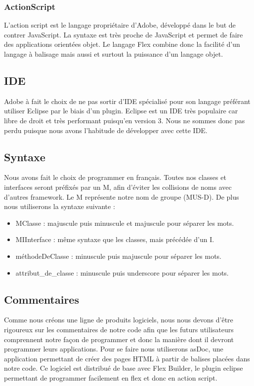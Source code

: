 \documentclass{article}
\begin{document}
		\subsubsection{ActionScript}
			L'action script est le langage propriétaire d'Adobe, développé dans le but de contrer JavaScript. La syntaxe est très proche de JavaScript et permet de faire des applications orientées objet. Le langage Flex combine donc la facilité d'un langage à balisage mais aussi et surtout la puissance d'un langage objet.
	\subsection{IDE}
		Adobe à fait le choix de ne pas sortir d'IDE spécialisé pour son langage préférant utiliser Eclipse par le biais d'un plugin. Eclipse est un IDE très populaire car libre de droit et très performant puisqu'en version 3. Nous ne sommes donc pas perdu puisque nous avons l'habitude de développer avec cette IDE.
	\subsection{Syntaxe}
		Nous avons fait le choix de programmer en français. Toutes nos classes et interfaces seront préfixés par un M, afin d'éviter les collisions de noms avec d'autres framework. Le M représente notre nom de groupe (MUS-D).
		\ident De plus nous utiliserons la syntaxe suivante :
		\begin{itemize}
			\item MClasse : majuscule puis minuscule et majuscule pour séparer les mots.
			\item MIInterface : même syntaxe que les classes, mais précédée d'un I.
			\item méthodeDeClasse : minuscule puis majuscule pour séparer les mots.
			\item attribut\_de\_classe : minuscule puis underscore pour séparer les mots.
		\end{itemize}
		
	\subsection{Commentaires}
		Comme nous créons une ligne de produits logiciels, nous nous devons d'être rigoureux sur les commentaires de notre code afin que les futurs utilisateurs comprennent notre façon de programmer et donc la manière dont il devront programmer leurs applications.
		\indent Pour se faire nous utiliserons asDoc, une application permettant de créer des pages HTML à partir de balises placées dans notre code. Ce logiciel est distribué de base avec Flex Builder, le plugin eclipse permettant de programmer facilement en flex et donc en action script.
\end{document}
